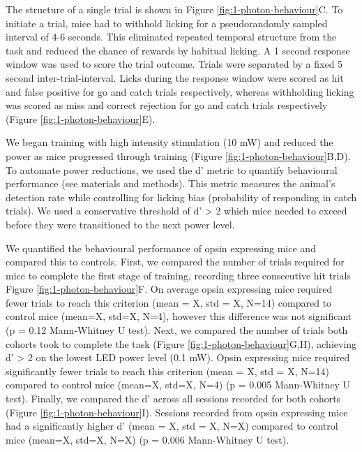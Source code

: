 The structure of a single trial is shown in Figure \ref{fig:1-photon-behaviour}C. To initiate a trial, mice had to withhold licking for a pseudorandomly sampled interval of 4-6 seconds. This eliminated repeated temporal structure from the task and reduced the chance of rewards by habitual licking. A 1 second response window was used to score the trial outcome. Trials were separated by a fixed 5 second inter-trial-interval. Licks during the response window were scored as hit and false positive for go and catch trials respectively, whereas withholding licking was scored as miss and correct rejection for go and catch trials respectively (Figure \ref{fig:1-photon-behaviour}E). 

 We began training with high intensity stimulation (10 mW) and reduced the power as mice progressed through training (Figure \ref{fig:1-photon-behaviour}B,D). To automate power reductions, we used the d' metric to quantify behavioural performance (see materials and methods). This metric measures the animal's detection rate while controlling for licking bias (probability of responding in catch trials). We used a conservative threshold of d' > 2 which mice needed to exceed before they were transitioned to the next power level.
 
 We quantified the behavioural performance of opsin expressing mice and compared this to controls. First, we compared the number of trials required for mice to complete the first stage of training, recording three consecutive hit trials Figure \ref{fig:1-photon-behaviour}F. On average opsin expressing mice required fewer trials to reach this criterion (mean = X, std = X, N=14) compared to control mice (mean=X, std=X, N=4), however this difference was not significant (p = 0.12 Mann-Whitney U test). Next, we compared the number of trials both cohorts took to complete the task (Figure \ref{fig:1-photon-behaviour}G,H), achieving d' > 2 on the lowest LED power level (0.1 mW). Opsin expressing mice required significantly fewer trials to reach this criterion (mean = X, std = X, N=14) compared to control mice (mean=X, std=X, N=4) (p = 0.005 Mann-Whitney U test). Finally, we compared the d' across all sessions recorded for both cohorts (Figure \ref{fig:1-photon-behaviour}I). Sessions recorded from opsin expressing mice had a significantly higher d' (mean = X, std = X, N=X) compared to control mice (mean=X, std=X, N=X) (p = 0.006 Mann-Whitney U test).
 
